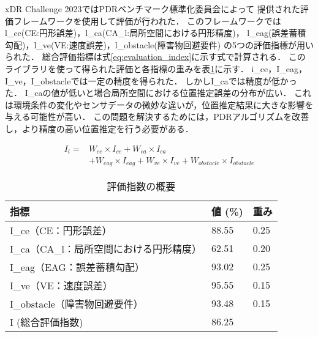 xDR Challenge 2023ではPDRベンチマーク標準化委員会によって
提供された評価フレームワークを使用して評価が行われた．
このフレームワークではl\_ce(CE:円形誤差)，l\_ca(CA\_l:局所空間における円形精度)，
l\_eag(誤差蓄積勾配)，l\_ve(VE:速度誤差)，l\_obstacle(障害物回避要件)
の5つの評価指標が用いられた．
総合評価指標は式\ref{eq:evaluation_index}に示す式で計算される．
このライブラリを使って得られた評価と各指標の重みを表\ref{table:evaluation_index}に示す．
i\_ce，I\_eag， I\_ve，I\_obstacleでは一定の精度を得られた．
しかしI\_caでは精度が低かった．
I\_caの値が低いと場合局所空間における位置推定誤差の分布が広い．
これは環境条件の変化やセンサデータの微妙な違いが，位置推定結果に大きな影響を与える可能性が高い．
この問題を解決するためには，PDRアルゴリズムを改善し，より精度の高い位置推定を行う必要がある．

\begin{equation}
	\begin{aligned}
		I_i = & W_{ce} \times I_{ce} + W_{ca} \times I_{ca}                                        \\
		      & + W_{eag} \times I_{eag} + W_{ve} \times I_{ve} + W_{obstacle} \times I_{obstacle}
	\end{aligned}
	\label{eq:evaluation_index}
\end{equation}


\begin{table}[ht]
	\caption{評価指数の概要}
	\centering
	\begin{tabular}{l|l|l}
		\hline
		指標                        & 値 (\%) & 重み   \\ \hline
		I\_ce（CE：円形誤差）            & 88.55  & 0.25 \\
		I\_ca（CA\_l：局所空間における円形精度） & 62.51  & 0.20 \\
		I\_eag（EAG：誤差蓄積勾配）        & 93.02  & 0.25 \\
		I\_ve（VE：速度誤差）            & 95.55  & 0.15 \\
		I\_obstacle（障害物回避要件）      & 93.48  & 0.15 \\
		I (総合評価指数)                & 86.25  &      \\ \hline
	\end{tabular}
	\label{table:evaluation_index}
\end{table}


